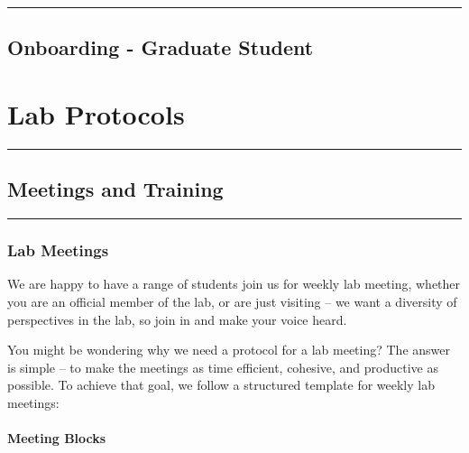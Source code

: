 \documentclass[]{book}
\begin{document}
\begin{center}\rule{0.5\linewidth}{0.5pt}\end{center}

\hypertarget{onboarding---graduate-student}{%
\section{Onboarding - Graduate Student}\label{onboarding---graduate-student}}

\hypertarget{lab-protocols}{%
\chapter{Lab Protocols}\label{lab-protocols}}

\begin{center}\rule{0.5\linewidth}{0.5pt}\end{center}

\hypertarget{meetings-and-training}{%
\section{Meetings and Training}\label{meetings-and-training}}

\begin{center}\rule{0.5\linewidth}{0.5pt}\end{center}

\hypertarget{lab-meetings}{%
\subsection{Lab Meetings}\label{lab-meetings}}

We are happy to have a range of students join us for weekly lab meeting, whether you are an official member of the lab, or are just visiting -- we want a diversity of perspectives in the lab, so join in and make your voice heard.

You might be wondering why we need a protocol for a lab meeting? The answer is simple -- to make the meetings as time efficient, cohesive, and productive as possible. To achieve that goal, we follow a structured template for weekly lab meetings:

\hypertarget{meeting-blocks}{%
\subsubsection{Meeting Blocks}\label{meeting-blocks}}
\end{document}
